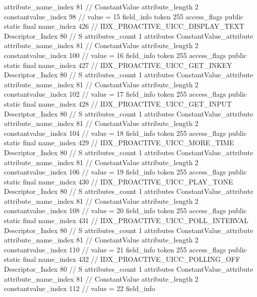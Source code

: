 {{{{{{{					attribute_name_index	81		// ConstantValue
					attribute_length	2
					constantvalue_index	98		// value = 15
				}
				}
			}
			field_info {
				token	255
				access_flags	public static final
				name_index	426		// IDX_PROACTIVE_UICC_DISPLAY_TEXT
				Descriptor_Index	80		// S
				attributes_count	1
				attributes {
				ConstantValue_attribute {
					attribute_name_index	81		// ConstantValue
					attribute_length	2
					constantvalue_index	100		// value = 16
				}
				}
			}
			field_info {
				token	255
				access_flags	public static final
				name_index	427		// IDX_PROACTIVE_UICC_GET_INKEY
				Descriptor_Index	80		// S
				attributes_count	1
				attributes {
				ConstantValue_attribute {
					attribute_name_index	81		// ConstantValue
					attribute_length	2
					constantvalue_index	102		// value = 17
				}
				}
			}
			field_info {
				token	255
				access_flags	public static final
				name_index	428		// IDX_PROACTIVE_UICC_GET_INPUT
				Descriptor_Index	80		// S
				attributes_count	1
				attributes {
				ConstantValue_attribute {
					attribute_name_index	81		// ConstantValue
					attribute_length	2
					constantvalue_index	104		// value = 18
				}
				}
			}
			field_info {
				token	255
				access_flags	public static final
				name_index	429		// IDX_PROACTIVE_UICC_MORE_TIME
				Descriptor_Index	80		// S
				attributes_count	1
				attributes {
				ConstantValue_attribute {
					attribute_name_index	81		// ConstantValue
					attribute_length	2
					constantvalue_index	106		// value = 19
				}
				}
			}
			field_info {
				token	255
				access_flags	public static final
				name_index	430		// IDX_PROACTIVE_UICC_PLAY_TONE
				Descriptor_Index	80		// S
				attributes_count	1
				attributes {
				ConstantValue_attribute {
					attribute_name_index	81		// ConstantValue
					attribute_length	2
					constantvalue_index	108		// value = 20
				}
				}
			}
			field_info {
				token	255
				access_flags	public static final
				name_index	431		// IDX_PROACTIVE_UICC_POLL_INTERVAL
				Descriptor_Index	80		// S
				attributes_count	1
				attributes {
				ConstantValue_attribute {
					attribute_name_index	81		// ConstantValue
					attribute_length	2
					constantvalue_index	110		// value = 21
				}
				}
			}
			field_info {
				token	255
				access_flags	public static final
				name_index	432		// IDX_PROACTIVE_UICC_POLLING_OFF
				Descriptor_Index	80		// S
				attributes_count	1
				attributes {
				ConstantValue_attribute {
					attribute_name_index	81		// ConstantValue
					attribute_length	2
					constantvalue_index	112		// value = 22
				}
				}
			}
			field_info {
}}}}}
